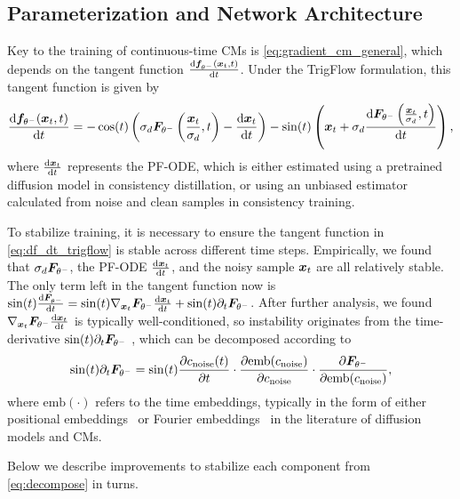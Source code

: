 \subsection{Parameterization and Network Architecture}
\label{sec:stable_parameterization}

Key to the training of continuous-time CMs is \eqref{eq:gradient_cm_general}, which depends on the tangent function $\frac{\mathrm{d} {\bm{f}}_{\theta^-}({\bm{x}}_t, t)}{\mathrm{d} t}$. Under the TrigFlow formulation, this tangent function is given by
\begin{equation}
\label{eq:df_dt_trigflow}
    \frac{\mathrm{d} {\bm{f}}_{\theta^-}({\bm{x}}_t,t)}{\mathrm{d} t} = -\cos(t)\left(\sigma_d{\bm{F}}_{\theta^-}\left(\frac{{\bm{x}}_t}{\sigma_d}, t\right) - \frac{\mathrm{d}{\bm{x}}_t}{\mathrm{d} t}\right) 
    - \sin(t)\left({\bm{x}}_t + \sigma_d \frac{\mathrm{d} {\bm{F}}_{\theta^-}\left(\frac{{\bm{x}}_t}{\sigma_d}, t\right)}{\mathrm{d} t}\right),
\end{equation}
where $\frac{\mathrm{d}{\bm{x}}_t}{\mathrm{d} t}$ represents the PF-ODE, which is either estimated using a pretrained diffusion model in consistency distillation, or using an unbiased estimator calculated from noise and clean samples in consistency training. 

To stabilize training, it is necessary to ensure the tangent function in \eqref{eq:df_dt_trigflow} is stable across different time steps. Empirically, we found that $\sigma_d {\bm{F}}_{\theta^-}$, the PF-ODE $\frac{\mathrm{d} {\bm{x}}_t}{\mathrm{d} t}$, and the noisy sample ${\bm{x}}_t$ are all relatively stable. The only term left in the tangent function now is $\sin(t) \frac{\mathrm{d} {\bm{F}}_{\theta^-}}{\mathrm{d} t} = \sin(t) \nabla_{{\bm{x}}_t} {\bm{F}}_{\theta^-} \frac{\mathrm{d} {\bm{x}}_t}{\mathrm{d} t} + \sin(t) \partial_t {\bm{F}}_{\theta^-}$. After further analysis, we found $\nabla_{{\bm{x}}_t} {\bm{F}}_{\theta^-} \frac{\mathrm{d} {\bm{x}}_t}{\mathrm{d} t}$ is typically well-conditioned, so instability originates from the time-derivative $\sin(t) \partial_t {\bm{F}}_{\theta^-}$%
, which can be decomposed according to
\begin{equation}
\sin(t)\partial_t {\bm{F}}_{\theta^-} = \sin(t)\frac{\partial c_{\text{noise}}(t)}{\partial t} \cdot \frac{\partial \text{emb}(c_{\text{noise}})}{\partial c_{\text{noise}}} \cdot \frac{\partial {\bm{F}}_{\theta^-}}{\partial \text{emb}(c_{\text{noise}})},\label{eq:decompose}
\end{equation}
where $\text{emb}(\cdot)$ refers to the time embeddings, typically in the form of either positional embeddings~\citep{ho2020ddpm,vaswani2017attention} or Fourier embeddings~\citep{song2020score,tancik2020fourier} in the literature of diffusion models and CMs. 

Below we describe improvements to stabilize each component from \eqref{eq:decompose} in turns.





